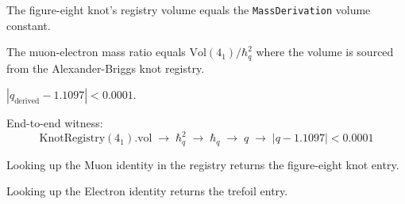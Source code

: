 \begin{theorem}
  \label{thm:registry-volume}
  \leanok
  The figure-eight knot's registry volume equals the
  \texttt{MassDerivation} volume constant.
\end{theorem}

\begin{theorem}
  \label{thm:skein-mass-residue}
  The muon-electron mass ratio equals
  $\mathrm{Vol}(4_1)/\hbar_q^2$ where the volume is sourced from
  the Alexander-Briggs knot registry.
\end{theorem}

\begin{theorem}
  \label{thm:substrate-error-bound}
  $|q_{\mathrm{derived}} - 1.1097| < 0.0001$.
\end{theorem}

\begin{theorem}
  \label{thm:full-derivation-chain}
  End-to-end witness:
  \[
    \mathrm{KnotRegistry}(4_1).\mathrm{vol}
      \;\longrightarrow\; \hbar_q^2
      \;\longrightarrow\; \hbar_q
      \;\longrightarrow\; q
      \;\longrightarrow\; |q - 1.1097| < 0.0001
  \]
\end{theorem}

\begin{theorem}
  \label{thm:muon-is-figure-eight}
  \leanok
  Looking up the Muon identity in the registry returns the figure-eight
  knot entry.
\end{theorem}

\begin{theorem}
  \label{thm:electron-is-trefoil}
  \leanok
  Looking up the Electron identity returns the trefoil entry.
\end{theorem}


